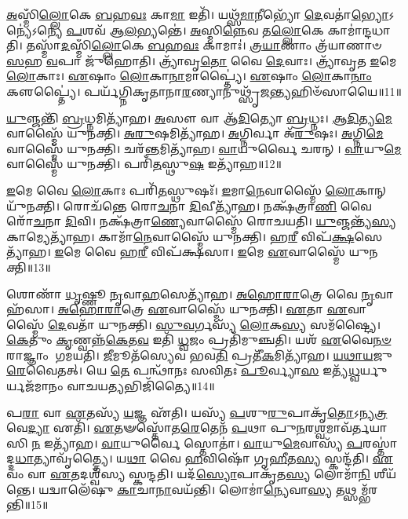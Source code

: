 \-\ul{𑌅}\-𑌸𑍍𑌮𑌿𑌁\-\ul{𑌲𑍍𑌲𑍋}\-𑌕𑍇 \ul{𑌬}\-𑌹\-\ul{𑌵𑌃} 𑌕𑌾\-\ul{𑌮𑌾} 𑌇𑌤𑌿᳴।
𑌯𑌥𑍍𑌸᳴\-\ul{𑌮𑌾}\-𑌨𑍀𑌭𑍍𑌯𑍋᳴ \ul{𑌦𑍇}\-𑌵𑌤𑌾॑\-\ul{𑌭𑍍𑌯𑍋}\-\-𑌽𑌨𑍍𑌯𑍇॑\-𑌽𑌨𑍍𑌯𑍇 \ul{𑌪}\-𑌶𑌵᳴ 𑌆\-\ul{𑌲}\-𑌭𑍍𑌯𑌨𑍍𑌤𑍇॑।
\-\ul{𑌅}\-𑌸𑍍𑌮𑌿\-\ul{𑌨𑍍𑌨𑍇}\-𑌵 𑌤\-\ul{𑌲𑍍𑌲𑍋}\-𑌕𑍇 𑌕𑌾𑌮𑌾॑𑌨𑍍𑌦𑌧𑌾𑌤𑌿।
𑌤𑌸𑍍𑌮𑌾᳴\-\ul{𑌦}\-𑌸𑍍𑌮𑌿𑌁\-\ul{𑌲𑍍𑌲𑍋}\-𑌕𑍇 \ul{𑌬}\-𑌹\-\ul{𑌵𑌃} 𑌕𑌾𑌮𑌾𑌃॑।
\-\ul{𑌤𑍍𑌰}\-\-\ul{𑌯𑌾}\-𑌣𑌾𑌂 𑌤𑍍𑌰᳴𑌯𑌾𑌣𑌾𑍞 \ul{𑌸}\-𑌹 \ul{𑌵}\-𑌪𑌾 𑌜𑍁᳴𑌹𑍋𑌤𑌿।
𑌤𑍍𑌰𑍍𑌯𑌾᳴𑌵𑍃\-\ul{𑌤𑍋} 𑌵𑍈 \ul{𑌦𑍇}\-𑌵𑌾𑌃।
𑌤𑍍𑌰𑍍𑌯𑌾᳴𑌵𑍃𑌤 \ul{𑌇}\-𑌮𑍇 \ul{𑌲𑍋}\-𑌕𑌾𑌃।
\-\ul{𑌏}\-𑌷𑌾𑌂 \ul{𑌲𑍋}\-𑌕𑌾\-\ul{𑌨𑌾}\-𑌮𑌾𑌪𑍍𑌤𑍍𑌯𑍈॑।
\-\ul{𑌏}\-𑌷𑌾𑌂 \ul{𑌲𑍋}\-𑌕𑌾\-\ul{𑌨𑌾𑌂} 𑌕𑍢𑌪𑍍𑌤𑍍𑌯𑍈॑।
𑌪𑌰𑍍𑌯᳴𑌗𑍍𑌨𑌿𑌕𑍃𑌤𑌾𑌨𑌾\-\ul{𑌰}\-𑌣𑍍𑌯𑌾\-𑌨𑍁𑌥𑍍𑌸𑍃᳴\-\ul{𑌜}\-𑌨𑍍𑌤𑍍𑌯𑌹𑌿𑍞᳴𑌸𑌾𑌯𑍈॥11॥\anuvakamend[𑌅𑌵᳴𑌰𑍁𑌦𑍍𑌧𑍍𑌯𑌾 \ul{𑌉}\-𑌭𑌯𑌾॑\-\ul{𑌨𑍍𑌪}\-𑌶𑍂𑌨𑌾𑌲᳴𑌭𑌤𑍇 \ul{𑌸}\-𑌤𑍍𑌯𑌾𑌦𑌹𑌿𑍞᳴𑌸𑌾𑌯𑍈]

\-\ul{𑌯𑍁}\-𑌞𑍍𑌜𑌨𑍍𑌤𑌿᳴ \ul{𑌬𑍍𑌰}\-𑌧𑍍𑌨𑌮𑌿𑌤𑍍𑌯𑌾᳴𑌹।
\-\ul{𑌅}\-𑌸𑍗 𑌵𑌾 𑌆᳴\-\ul{𑌦𑌿}\-𑌤𑍍𑌯𑍋 \ul{𑌬𑍍𑌰}\-𑌧𑍍𑌨𑌃।
\-\ul{𑌆}\-\-\ul{𑌦𑌿}\-𑌤𑍍𑌯\-\ul{𑌮𑍇}\-𑌵𑌾𑌸𑍍𑌮𑍈᳴ 𑌯𑍁𑌨𑌕𑍍𑌤𑌿।
\-\ul{𑌅}\-\-\ul{𑌰𑍁}\-𑌷𑌮𑌿𑌤𑍍𑌯𑌾᳴𑌹।
\-\ul{𑌅}\-𑌗𑍍𑌨𑌿𑌰𑍍𑌵𑌾 𑌅᳴\-\ul{𑌰𑍁}\-𑌷𑌃।
\-\ul{𑌅}\-𑌗𑍍𑌨𑌿\-\ul{𑌮𑍇}\-𑌵𑌾𑌸𑍍𑌮𑍈᳴ 𑌯𑍁𑌨𑌕𑍍𑌤𑌿।
𑌚𑌰᳴\-\ul{𑌨𑍍𑌤}\-𑌮𑌿𑌤𑍍𑌯𑌾᳴𑌹।
\-\ul{𑌵𑌾}\-𑌯𑍁𑌰𑍍𑌵𑍈 𑌚𑌰𑌨𑍍।
\-\ul{𑌵𑌾}\-𑌯𑍁\-\ul{𑌮𑍇}\-𑌵𑌾𑌸𑍍𑌮𑍈᳴ 𑌯𑍁𑌨𑌕𑍍𑌤𑌿।
𑌪𑌰𑌿᳴\-\ul{𑌤}\-𑌸𑍍𑌥𑍁\-\ul{𑌷} 𑌇𑌤𑍍𑌯𑌾᳴𑌹॥12॥

\-\ul{𑌇}\-𑌮𑍇 𑌵𑍈 \ul{𑌲𑍋}\-𑌕𑌾𑌃 𑌪𑌰𑌿᳴\-\ul{𑌤}\-𑌸𑍍𑌥𑍁𑌷𑌃᳴।
\-\ul{𑌇}\-𑌮𑌾\-\ul{𑌨𑍇}\-𑌵𑌾𑌸𑍍𑌮𑍈᳴ \ul{𑌲𑍋}\-𑌕𑌾𑌨𑍍 𑌯𑍁᳴𑌨𑌕𑍍𑌤𑌿।
𑌰𑍋𑌚᳴𑌨𑍍𑌤𑍇 𑌰𑍋\-\ul{𑌚}\-𑌨𑌾 \ul{𑌦𑌿}\-𑌵𑍀𑌤𑍍𑌯𑌾᳴𑌹।
𑌨𑌕𑍍𑌷᳴𑌤𑍍𑌰𑌾\-\ul{𑌣𑌿} 𑌵𑍈 𑌰𑍋᳴\-\ul{𑌚}\-𑌨𑌾 \ul{𑌦𑌿}\-𑌵𑌿।
𑌨𑌕𑍍𑌷᳴𑌤𑍍𑌰𑌾\-\ul{𑌣𑍍𑌯𑍇}\-𑌵𑌾𑌸𑍍𑌮𑍈᳴ 𑌰𑍋𑌚𑌯𑌤𑌿।
\-\ul{𑌯𑍁}\-𑌞𑍍𑌜𑌨𑍍𑌤𑍍𑌯᳴\-\ul{𑌸𑍍𑌯} 𑌕𑌾𑌮𑍍𑌯𑍇𑌤𑍍𑌯𑌾᳴𑌹।
𑌕𑌾𑌮𑌾᳴\-\ul{𑌨𑍇}\-𑌵𑌾𑌸𑍍𑌮𑍈᳴ 𑌯𑍁𑌨𑌕𑍍𑌤𑌿।
𑌹\-\ul{𑌰𑍀} 𑌵𑌿𑌪᳴\-\ul{𑌕𑍍𑌷}\-𑌸𑍇𑌤𑍍𑌯𑌾᳴𑌹।
\-\ul{𑌇}\-𑌮𑍇 𑌵𑍈 𑌹\-\ul{𑌰𑍀} 𑌵𑌿𑌪᳴𑌕𑍍𑌷𑌸𑌾।
\-\ul{𑌇}\-𑌮𑍇 \ul{𑌏}\-𑌵𑌾𑌸𑍍𑌮𑍈᳴ 𑌯𑍁𑌨𑌕𑍍𑌤𑌿॥13॥

𑌶𑍋𑌣𑌾᳴ \ul{𑌧𑍃}\-𑌷𑍍𑌣𑍂 \ul{𑌨𑍃}\-𑌵𑌾\-\ul{𑌹}\-𑌸𑍇𑌤𑍍𑌯𑌾᳴𑌹।
\-\ul{𑌅}\-\-\ul{𑌹𑍋}\-\-\ul{𑌰𑌾}\-𑌤𑍍𑌰𑍇 𑌵𑍈 \ul{𑌨𑍃}\-𑌵𑌾𑌹᳴𑌸𑌾।
\-\ul{𑌅}\-\-\ul{𑌹𑍋}\-\-\ul{𑌰𑌾}\-𑌤𑍍𑌰𑍇 \ul{𑌏}\-𑌵𑌾𑌸𑍍𑌮𑍈᳴ 𑌯𑍁𑌨𑌕𑍍𑌤𑌿।
\-\ul{𑌏}\-𑌤𑌾 \ul{𑌏}\-𑌵𑌾𑌸𑍍𑌮𑍈᳴ \ul{𑌦𑍇}\-𑌵𑌤𑌾᳴ 𑌯𑍁𑌨𑌕𑍍𑌤𑌿।
\-\ul{𑌸𑍁}\-\-\ul{𑌵}\-𑌰𑍍𑌗𑌸𑍍𑌯᳴ \ul{𑌲𑍋}\-𑌕\-\ul{𑌸𑍍𑌯} 𑌸𑌮᳴𑌷𑍍𑌟𑍍𑌯𑍈।
\-\ul{𑌕𑍇}\-𑌤𑍁𑌂 \ul{𑌕𑍃}\-𑌣𑍍𑌵𑌨𑍍𑌨᳴\-\ul{𑌕𑍇}\-𑌤\-\ul{𑌵} 𑌇𑌤𑌿᳴ \ul{𑌧𑍍𑌵}\-𑌜𑌂 𑌪𑍍𑌰𑌤𑌿᳴\-𑌮𑍁𑌞𑍍𑌚𑌤𑌿।
𑌯𑌶᳴ \ul{𑌏}\-𑌵𑍈\-\ul{𑌨}\-\-\ul{𑍞} 𑌰𑌾𑌜𑍍𑌞𑌾𑌂 𑌗𑌮𑌯𑌤𑌿।
\-\ul{𑌜𑍀}\-𑌮𑍂𑌤᳴𑌸𑍍𑌯𑍇𑌵 𑌭𑌵\-\ul{𑌤𑌿} 𑌪𑍍𑌰𑌤𑍀᳴\-\ul{𑌕}\-𑌮𑌿𑌤𑍍𑌯𑌾᳴𑌹।
\-\ul{𑌯}\-\-\ul{𑌥𑌾}\-\-\ul{𑌯}\-𑌜𑍁\-\ul{𑌰𑍇}\-𑌵𑍈𑌤𑌤𑍍।
𑌯𑍇 \ul{𑌤𑍇} 𑌪𑌨𑍍𑌥𑌾᳴𑌨𑌃 𑌸𑌵𑌿𑌤𑌃 \ul{𑌪𑍂}\-𑌰𑍍𑌵𑍍𑌯𑌾\-\ul{𑌸} 𑌇𑌤𑍍𑌯᳴\-\ul{𑌧𑍍𑌵}\-𑌰𑍍𑌯𑍁𑌰𑍍𑌯𑌜᳴𑌮𑌾𑌨𑌂 𑌵𑌾𑌚𑌯\-\ul{𑌤𑍍𑌯}\-𑌭𑌿𑌜𑌿᳴𑌤𑍍𑌯𑍈॥14॥

𑌪\-\ul{𑌰𑌾} 𑌵𑌾 \ul{𑌏}\-𑌤𑌸𑍍𑌯᳴ \ul{𑌯}\-𑌜𑍍𑌞 𑌏᳴𑌤𑌿।
𑌯𑌸𑍍𑌯᳴ \ul{𑌪}\-𑌶𑍁\-\ul{𑌰𑍁}\-𑌪𑌾𑌕𑍃᳴\-\ul{𑌤𑍋}\-\-𑌽𑌨𑍍𑌯\-\ul{𑌤𑍍𑌰} 𑌵𑍇\-\ul{𑌦𑍍𑌯𑌾} 𑌏𑌤𑌿᳴।
\-\ul{𑌏}\-𑌤𑍟𑌸𑍍𑌤𑍋᳴𑌤\-\ul{𑌰𑍇}\-𑌤𑍇𑌨᳴ \ul{𑌪}\-𑌥𑌾 𑌪𑍁\-\ul{𑌨}\-𑌰\-\ul{𑌶𑍍𑌵}\-𑌮𑌾𑌵᳴𑌰𑍍𑌤𑌯𑌾𑌸𑌿 \ul{𑌨} 𑌇𑌤𑍍𑌯𑌾᳴𑌹।
\-\ul{𑌵𑌾}\-𑌯𑍁𑌰𑍍𑌵𑍈 𑌸𑍍𑌤𑍋𑌤𑌾॑।
\-\ul{𑌵𑌾}\-𑌯𑍁\-\ul{𑌮𑍇}\-𑌵𑌾𑌸𑍍𑌯᳴ \ul{𑌪}\-𑌰𑌸𑍍𑌤𑌾॑𑌦𑍍𑌦\-\ul{𑌧𑌾}\-𑌤𑍍𑌯𑌾𑌵𑍃᳴𑌤𑍍𑌤𑍍𑌯𑍈।
𑌯\-\ul{𑌥𑌾} 𑌵𑍈 \ul{𑌹}\-𑌵𑌿𑌷𑍋᳴ 𑌗𑍃\-\ul{𑌹𑍀}\-𑌤\-\ul{𑌸𑍍𑌯} 𑌸𑍍𑌕𑌨𑍍𑌦᳴𑌤𑌿।
\-\ul{𑌏}\-𑌵𑌂 𑌵𑌾 \ul{𑌏}\-𑌤𑌦𑌶𑍍𑌵᳴𑌸𑍍𑌯 𑌸𑍍𑌕𑌨𑍍𑌦𑌤𑌿।
𑌯𑌦᳴\-\ul{𑌸𑍍𑌯𑍋}\-𑌪𑌾𑌕𑍃᳴𑌤\-\ul{𑌸𑍍𑌯} 𑌲𑍋𑌮𑌾᳴\-\ul{𑌨𑌿} 𑌶𑍀𑌯᳴𑌨𑍍𑌤𑍇।
𑌯𑌦𑍍𑌵𑌾𑌲𑍇᳴𑌷𑍁 \ul{𑌕𑌾}\-𑌚𑌾\-\ul{𑌨𑌾}\-𑌵𑌯᳴𑌨𑍍𑌤𑌿।
𑌲𑍋𑌮𑌾॑\-\ul{𑌨𑍍𑌯𑍇}\-𑌵𑌾\-\ul{𑌸𑍍𑌯} 𑌤𑌥𑍍𑌸𑌮𑍍𑌭᳴𑌰𑌨𑍍𑌤𑌿॥15॥

